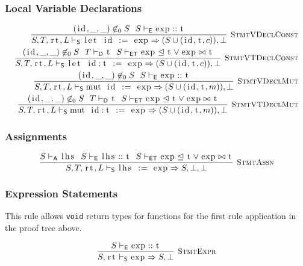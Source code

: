 \documentclass{article}
\newcommand{\code}[1]{\lstinline[columns=fixed]{#1}}
\newcommand{\drmrule}[5]{\frac{#1}{#2\vdash_{\mathsf{#3}}#4}\textsc{\ \small{#5}}}
\newcommand{\ruleapp}[1]{\vdash_{\mathsf{#1}}}
\newcommand{\mc}[1]{\textnormal{\code{#1}}}
\begin{document}
			\subsubsection{Local Variable Declarations}
			
				\begin{align*}
					\drmrule{(\mc{id},\_,\_)\not\in_0 S\ \ S\ruleapp{E}\mc{exp} :: \mc{t}}{S,T,\mc{rt},L}{S}{\mc{let id := exp} \Rightarrow (S \cup (\mc{id},\mc{t},c)),\bot}{StmtVDeclConst}\\
					\drmrule{(\mc{id},\_,\_)\not\in_0 S\ \ T\ruleapp{D}\mc{t}\ \  S\ruleapp{ET}\mc{exp}\trianglelefteq\mc{t}\vee\mc{exp}\bowtie\mc{t}}{S,T,\mc{rt},L}{S}{\mc{let id:t := exp} \Rightarrow (S \cup (\mc{id},\mc{t},c)),\bot}{StmtVTDeclConst}\\
					\drmrule{(\mc{id},\_,\_)\not\in_0 S\ \ S\ruleapp{E}\mc{exp} :: \mc{t}}{S,T,\mc{rt},L}{S}{\mc{mut id := exp} \Rightarrow (S \cup (\mc{id},\mc{t},m)),\bot}{StmtVDeclMut}\\
					\drmrule{(\mc{id},\_,\_)\not\in_0 S\ \ T\ruleapp{D}\mc{t}\ \  S\ruleapp{ET}\mc{exp}\trianglelefteq\mc{t}\vee\mc{exp}\bowtie\mc{t}}{S,T,\mc{rt},L}{S}{\mc{mut id:t := exp} \Rightarrow (S \cup (\mc{id},\mc{t},m)),\bot}{StmtVTDeclMut}
				\end{align*}
			
			\subsubsection{Assignments}
			
				\begin{align*}
					\drmrule{S\ruleapp{A}\mc{lhs}\ \ S\ruleapp{E}\mc{lhs} :: \mc{t}\ \ S\ruleapp{ET}\mc{exp} \trianglelefteq \mc{t} \vee \mc{exp}\bowtie\mc{t}}{S,T,\mc{rt},L}{S}{\mc{lhs := exp} \Rightarrow S,\bot,\bot}{StmtAssn}
				\end{align*}
			
			\subsubsection{Expression Statements}
			
				This rule allows \code{void} return types for functions for the first rule application in the proof tree above.
			
				\begin{align*}
					\drmrule{S\ruleapp{E}\mc{exp} :: \mc{t}}{S,\mc{rt}}{S}{\mc{exp} \Rightarrow S,\bot}{StmtExpr}
				\end{align*}
				
\end{document}
